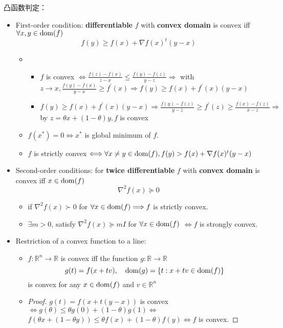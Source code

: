 \begin{remark}
    凸函数判定：
    \begin{itemize}
        \item First-order condition: \textbf{differentiable} $f$ with \textbf{convex domain} is convex iff $\forall x, y \in \operatorname{dom}(f)$\[f(y) \geq f(x)+\nabla f(x)^{t}(y-x)\]
        \begin{itemize}
            \item \proof\begin{itemize}
                \item $f$ is convex $\Longleftrightarrow \frac{f(z)-f(x)}{z-x} \leq \frac{f(y)-f(z)}{y-z} \Longrightarrow $ with $z \to x,\frac{f(y)-f(x)}{y-x} \ge f^\prime(x) \Longrightarrow f(y) \ge f(x) + f^\prime(x)(y - x)$
                \item $f(y) \ge f(x) + f^\prime(x)(y - x) \Longrightarrow \frac{f(y) - f(z)}{y - z} \ge f^\prime(z) \ge \frac{f(x) - f(z)}{x - z} \Longrightarrow $ by $z = \theta x + (1 - \theta)y,f$ is convex
            \end{itemize}
            \item $f(x^*) = 0 \Longleftrightarrow x^*$ is global minimum of $f$. 
            \item $f$ is strictly convex $\Longleftrightarrow \forall x \neq y\in \operatorname{dom}(f), f(y) > f(x) + \nabla f(x)^t(y - x)$
        \end{itemize}
        \item Second-order conditions: for \textbf{twice differentiable} $f$ with \textbf{convex domain} is convex iff $x \in \operatorname{dom}(f)$ \[\nabla^2f(x) \succeq 0\]
        \begin{itemize}
            \item if $\nabla^2 f(x) \succ 0$ for $\forall x \in \operatorname{dom}(f) \Longrightarrow f$ is strictly convex.
            \item $\exists m > 0$, satisfy $\nabla^2f(x) \succeq mI$ for $\forall x \in \operatorname{dom}(f)$ $\Longleftrightarrow f$ is strongly convex.
        \end{itemize}
        \item Restriction of a convex function to a line:
        \begin{itemize}
            \item $f: \mathbb{R}^n \to \mathbb{R}$ is convex iff the function $g: \mathbb{R} \to \mathbb{R}$\[g(t) = f(x + tv), \quad \operatorname{dom}(g) = \left\{t: x + tv \in \operatorname{dom}(f)\right\}\] is convex for any $x \in \operatorname{dom}(f)$ and $v \in \mathbb{R}^n$
            \item \begin{proof}$g(t) = f(x + t(y - x))$ is convex $\Longleftrightarrow g(\theta) \le \theta g(0) + (1 - \theta)g(1) \Longleftrightarrow$ $f(\theta x + (1 - \theta y)) \le \theta f(x) + (1 - \theta)f(y) \Longleftrightarrow f$ is convex.\end{proof}
        \end{itemize}
    \end{itemize}
\end{remark}

